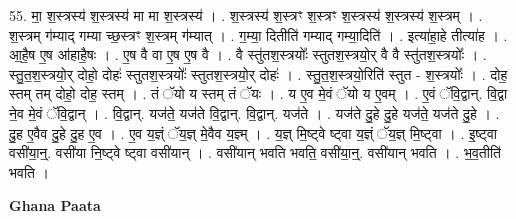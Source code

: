 \documentclass[17pt]{extarticle}
\begin{document}
55. मा॒ श॒स्त्रस्य॑ श॒स्त्रस्य॑ मा मा श॒स्त्रस्य॑ । . श॒स्त्रस्य॑ श॒स्त्रꣳ श॒स्त्रꣳ श॒स्त्रस्य॑ श॒स्त्रस्य॑ श॒स्त्रम् । . श॒स्त्रम् ग॑म्याद् गम्या च्छ॒स्त्रꣳ श॒स्त्रम् ग॑म्यात् । . ग॒म्या॒ दितीति॑ गम्याद् गम्या॒दिति॑ । . इत्या॑हा॒हे तीत्या॑ह । . आ॒है॒ष ए॒ष आ॑हाहै॒षः । . ए॒ष वै वा ए॒ष ए॒ष वै । . वै स्तु॑तश॒स्त्रयोः᳚ स्तुतश॒स्त्रयो॒र् वै वै स्तु॑तश॒स्त्रयोः᳚ । . स्तु॒त॒श॒स्त्रयो॒र् दोहो॒ दोहः॑ स्तुतश॒स्त्रयोः᳚ स्तुतश॒स्त्रयो॒र् दोहः॑ । . स्तु॒त॒श॒स्त्रयो॒रिति॑ स्तुत - श॒स्त्रयोः᳚ । . दोह॒ स्तम् तम् दोहो॒ दोह॒ स्तम् । . तं ॅयो य स्तम् तं ॅयः । . य ए॒व मे॒वं ॅयो य ए॒वम् । . ए॒वं ॅवि॒द्वान्. वि॒द्वा ने॒व मे॒वं ॅवि॒द्वान् । . वि॒द्वान्. यज॑ते॒ यज॑ते वि॒द्वान्. वि॒द्वान्. यज॑ते । . यज॑ते दु॒हे दु॒हे यज॑ते॒ यज॑ते दु॒हे । . दु॒ह ए॒वैव दु॒हे दु॒ह ए॒व । . ए॒व य॒ज्ञ्ं ॅय॒ज्ञ् मे॒वैव य॒ज्ञ्म् । . य॒ज्ञ् मि॒ष्ट्वे ष्ट्वा य॒ज्ञ्ं ॅय॒ज्ञ् मि॒ष्ट्वा । . इ॒ष्ट्वा वसी॑या॒न्॒. वसी॑या नि॒ष्ट्वे ष्ट्वा वसी॑यान् । . वसी॑यान् भवति भवति॒ वसी॑या॒न्॒. वसी॑यान् भवति । . भ॒व॒तीति॑ भवति । \newline

\textbf{Ghana Paata } \newline
\end{document}
